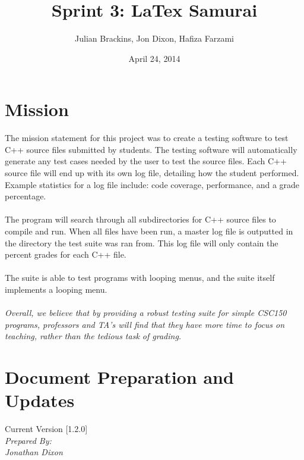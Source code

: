 \documentclass {article}
\title{\huge{\textbf{Sprint 3: LaTex Samurai}}}
\date{April 24, 2014}
\author{\Large{Julian Brackins, Jon Dixon, Hafiza Farzami}}
\begin{document}
	\maketitle
	\newpage
	\tableofcontents
	\newpage
	\listoffigures
	\newpage
	
	\section*{\LARGE{\color{blue}Mission}}
		The mission statement for this project was to create a testing
		 software to test C++ source files submitted by students. The
		 testing software will automatically generate any test cases needed
		 by the user to test the source files. Each C++ source file will
		 end up with its own log file, detailing how the student performed.
		 Example statistics for a log file include: code coverage,
		 performance, and a grade percentage.\\\\The program will search
		 through all subdirectories for C++ source files to compile and run.
		 When all files have been run, a master log file is outputted in the
		 directory the test suite was ran from. This log file will only
		 contain the percent grades for each C++ file. \\\\The suite is able
		 to test programs with looping menus, and the suite itself implements
		 a looping menu.\\\\\textit{Overall, we believe that by providing a robust
		 testing suite for simple CSC150 programs, professors and TA's will
		 find that they have more time to focus on teaching, rather than the
		 tedious task of grading.}
		 
	\newpage
	
	\section*{\LARGE{\color{blue}Document Preparation and Updates}}
		Current Version [1.2.0]\\
		
		{\noindent
		\textit{Prepared By:}\\
		\textit{Jonathan Dixon}\\
		}
		
\end{document}
